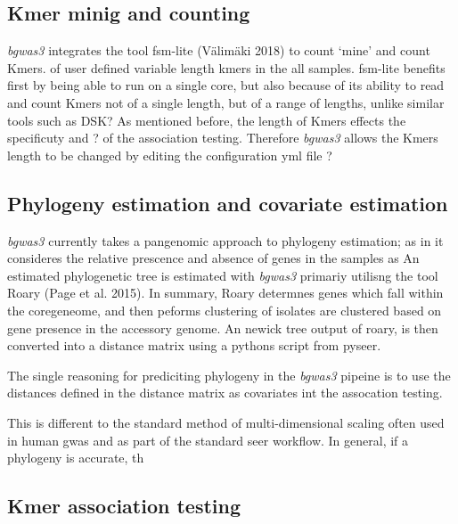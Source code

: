 \documentclass[]{article}
\begin{document}
\hypertarget{kmer-minig-and-counting}{%
\subsection{Kmer minig and counting}\label{kmer-minig-and-counting}}

\emph{bgwas3} integrates the tool fsm-lite (Välimäki 2018) to count
`mine' and count Kmers. of user defined variable length kmers in the all
samples. fsm-lite benefits first by being able to run on a single core,
but also because of its ability to read and count Kmers not of a single
length, but of a range of lengths, unlike similar tools such as DSK? As
mentioned before, the length of Kmers effects the specificuty and ? of
the association testing. Therefore \emph{bgwas3} allows the Kmers length
to be changed by editing the configuration yml file ?

\hypertarget{phylogeny-estimation-and-covariate-estimation}{%
\subsection{Phylogeny estimation and covariate
estimation}\label{phylogeny-estimation-and-covariate-estimation}}

\emph{bgwas3} currently takes a pangenomic approach to phylogeny
estimation; as in it consideres the relative prescence and absence of
genes in the samples as An estimated phylogenetic tree is estimated with
\emph{bgwas3} primariy utilisng the tool Roary (Page et al. 2015). In
summary, Roary determnes genes which fall within the coregeneome, and
then peforms clustering of isolates are clustered based on gene presence
in the accessory genome. An newick tree output of roary, is then
converted into a distance matrix using a pythons script from pyseer.

The single reasoning for prediciting phylogeny in the \emph{bgwas3}
pipeine is to use the distances defined in the distance matrix as
covariates int the assocation testing.

This is different to the standard method of multi-dimensional scaling
often used in human gwas and as part of the standard seer workflow. In
general, if a phylogeny is accurate, th

\hypertarget{kmer-association-testing}{%
\subsection{Kmer association testing}\label{kmer-association-testing}}
\end{document}
